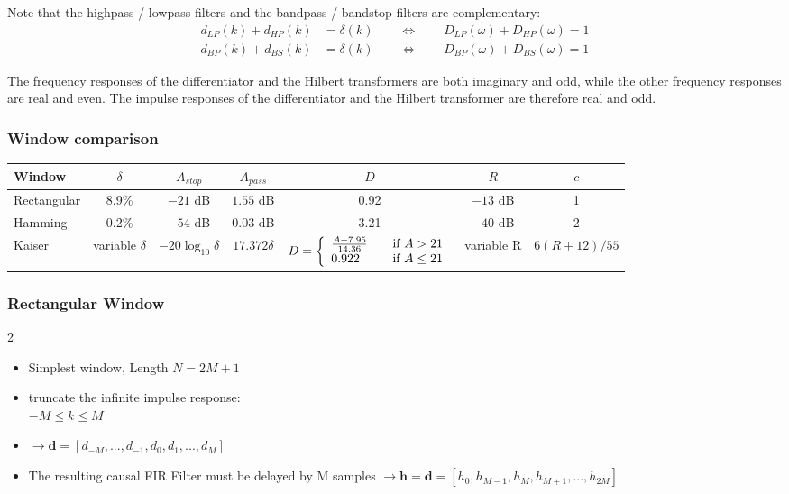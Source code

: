 Note that the highpass / lowpass filters and the bandpass / bandstop
filters are complementary:
\begin{align*}
	d_{LP}(k) + d_{HP}(k) &= \delta(k) \qquad \Leftrightarrow \qquad D_{LP}(\omega) + D_{HP}(\omega) = 1 \\
	d_{BP}(k) + d_{BS}(k) &= \delta(k) \qquad \Leftrightarrow \qquad D_{BP}(\omega) + D_{BS}(\omega) = 1
\end{align*}

The frequency responses of the differentiator and the Hilbert transformers
are both imaginary and odd, while the other frequency responses are real
and even. The impulse responses of the differentiator and the Hilbert
transformer are therefore real and odd.

\subsubsection{Window comparison}
\begin{tabular}{|l|c|c|c|c|c|c|}
	\hline
	Window & $\delta$ & $A_{stop}$ & $A_{pass}$ & $D$ & $R$ & $c$ \\
	\hline
	Rectangular & 8.9\% & $-21$ dB & $1.55$ dB & 0.92 & $-13$ dB & 1\\
	Hamming & 0.2\% & $-54$ dB & $0.03$ dB & 3.21 & $-40$ dB & 2\\
	Kaiser & variable $\delta$ & $-20\log_{10}\delta$ & $17.372\delta$ & $D = \left\{
						\begin{array}{l l}
							\frac{A-7.95}{14.36}& \quad \text{if } A>21\\
							0.922 & \quad \text{if } A \leq 21
						\end{array} \right.$ & variable R & $6(R+12)/55$\\
	\hline
\end{tabular}

\subsubsection{Rectangular Window}
\begin{multicols}{2}
	\begin{itemize}
		\item Simplest window, Length $N = 2M+1$
		\item truncate the infinite impulse response: \\ $-M \leq k \leq M$
		\item $\rightarrow \mathbf{d} = [d_{-M}, ..., d_{-1}, d_0, d_1, ..., d_M]$
		\item The resulting causal FIR Filter must be delayed by M samples \newline
		$\rightarrow \mathbf{h} = \mathbf{d} = [h_0, h_{M-1}, h_M, h_{M+1}, ..., h_{2M}]$
	\end{itemize}

	\begin{center}
		
	\end{center}
\end{multicols}

